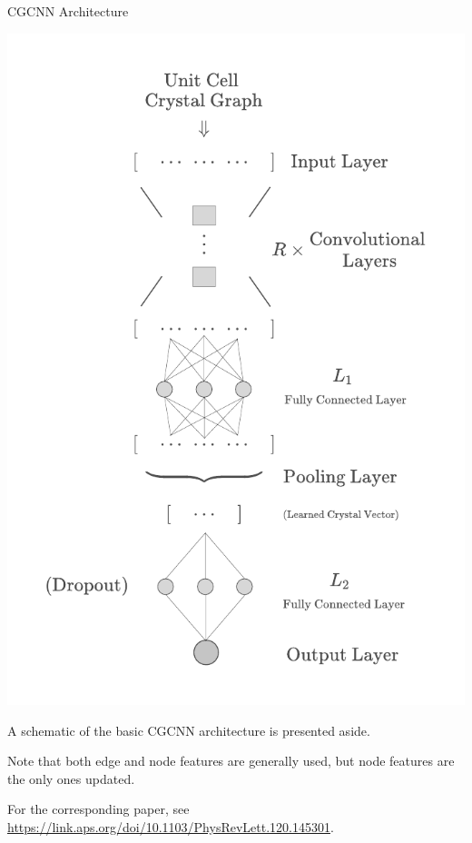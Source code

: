\documentclass[handout, 11pt]{beamer}
\begin{document}
\begin{frame}{CGCNN Architecture}
\begin{minipage}{.55\textwidth}
\begin{center}
\includegraphics[scale=0.45]{cgcnn_arch.pdf}
\end{center}
\end{minipage}%
\begin{minipage}{0.45\textwidth}
A schematic of the basic CGCNN architecture is presented aside.

\vspace{0.7cm}

Note that both edge and node features are generally used, but node features are the only ones updated.

\vspace{0.7cm}

For the corresponding paper, see \url{https://link.aps.org/doi/10.1103/PhysRevLett.120.145301}.
\end{minipage}

\end{frame}
\end{document}
